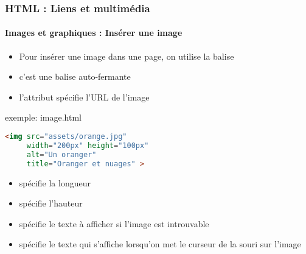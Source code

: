 \documentclass[xcolor=table]{beamer}
\begin{document}
\begin{frame}[fragile]
\frametitle{HTML : Liens et multimédia}
\framesubtitle{Images et graphiques : Insérer une image}

\begin{minipage}{0.50\textwidth} 
	\begin{itemize}
		\item Pour insérer une image dans une page, on utilise la balise 
		\item c'est une balise auto-fermante
		\item l'attribut  spécifie l'URL de l'image
	\end{itemize}
\end{minipage}
%
\begin{minipage}{0.49\textwidth}
\begin{exampleblock}{exemple: image.html}
\lstset{escapeinside=**}
\scriptsize\bfseries\vspace{-6pt}
\begin{lstlisting}[language={html}]
<img src="assets/orange.jpg"
     width="200px" height="100px"
     alt="Un oranger" 
     title="Oranger et nuages" >
\end{lstlisting}\vspace{-6pt}
\end{exampleblock}
\end{minipage}

\begin{itemize}
	\item {} spécifie la longueur 
	\item {} spécifie l'hauteur
	\item {} spécifie le texte à afficher si l'image est introuvable 
	\item {} spécifie le texte qui s'affiche lorsqu'on met le curseur de la souri sur l'image
\end{itemize}

\end{frame} 
\end{document}
